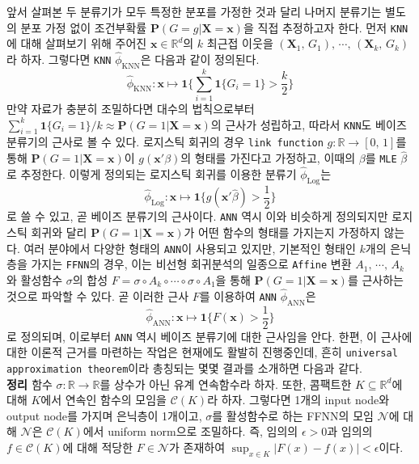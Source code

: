 \documentclass[11pt,onecolumn,twoside,a4size]{gsag3jnl}
\begin{document}
앞서 살펴본 두 분류기가 모두 특정한 분포를 가정한 것과 달리 나머지 분류기는 별도의 분포 가정 없이 조건부확률 $\mathbf{P}(G=g\vert\mathbf{X}=\mathbf{x})$을 직접 추정하고자 한다. 먼저 \texttt{KNN}에 대해 살펴보기 위해 주어진 $\mathbf{x}\in\mathbb{R}^d$의 $k$ 최근접 이웃을 $(\mathbf{X}_1,\,G_1),\,\cdots,\,(\mathbf{X}_k,\,G_k)$라 하자. 그렇다면 \texttt{KNN} $\widehat{\phi}_\mathrm{KNN}$은 다음과 같이 정의된다.
\begin{equation}\label{eq:KNN}
  \widehat{\phi}_\mathrm{KNN}:\mathbf{x}\mapsto\mathbf{1}\bigg\{\sum_{i=1}^k\mathbf{1}\{G_i=1\}>\frac{k}{2}\bigg\}
\end{equation}
만약 자료가 충분히 조밀하다면 대수의 법칙으로부터 $\sum_{i=1}^k\mathbf{1}\{G_i=1\}/k\approx\mathbf{P}(G=1\vert\mathbf{X}=\mathbf{x})$의 근사가 성립하고, 따라서 \texttt{KNN}도 베이즈 분류기의 근사로 볼 수 있다. 로지스틱 회귀의 경우 \texttt{link function} $g:\mathbb{R}\to[0,\,1]$를 통해 $\mathbf{P}(G=1\vert\mathbf{X}=\mathbf{x})$이 $g(\mathbf{x}'\beta)$의 형태를 가진다고 가정하고, 이때의 $\beta$를 \texttt{MLE} $\widehat{\beta}$로 추정한다. 이렇게 정의되는 로지스틱 회귀를 이용한 분류기 $\widehat{\phi}_\mathrm{Log}$는
\begin{equation}
  \widehat{\phi}_\mathrm{Log}:\mathbf{x}\mapsto\mathbf{1}\bigg\{g(\mathbf{x}'\widehat{\beta})>\frac{1}{2}\bigg\}
\end{equation}
로 쓸 수 있고, 곧 베이즈 분류기의 근사이다. \texttt{ANN} 역시 이와 비슷하게 정의되지만 로지스틱 회귀와 달리 $\mathbf{P}(G=1\vert\mathbf{X}=\mathbf{x})$가 어떤 함수의 형태를 가지는지 가정하지 않는다. 여러 분야에서 다양한 형태의 \texttt{ANN}이 사용되고 있지만, 기본적인 형태인 $k$개의 은닉층을 가지는 \texttt{FFNN}의 경우, 이는 비선형 회귀분석의 일종으로 \texttt{Affine} 변환 $A_1,\,\cdots,\,A_k$와 활성함수 $\sigma$의 합성 $F=\sigma\circ A_k\circ\cdots\circ\sigma\circ A_1$을 통해 $\mathbf{P}(G=1\vert\mathbf{X}=\mathbf{x})$를 근사하는 것으로 파악할 수 있다. 곧 이러한 근사 $F$를 이용하여 \texttt{ANN} $\widehat{\phi}_\mathrm{ANN}$은
\begin{equation}
  \widehat{\phi}_\mathrm{ANN}:\mathbf{x}\mapsto\mathbf{1}\bigg\{F(\mathbf{x})>\frac{1}{2}\bigg\}
\end{equation}
로 정의되며, 이로부터 \texttt{ANN} 역시 베이즈 분류기에 대한 근사임을 안다. 한편, 이 근사에 대한 이론적 근거를 마련하는 작업은 현재에도 활발히 진행중인데, 흔히 \texttt{universal approximation theorem}이라 총칭되는 몇몇 결과를 소개하면 다음과 같다.\\

\noindent\textsf{\textbf{정리 \citep{Cybenko1989}} 함수 $\sigma:\mathbb{R}\to\mathbb{R}$를 상수가 아닌 유계 연속함수라 하자. 또한, 콤팩트한 $K\subseteq\mathbb{R}^d$에 대해 $K$에서 연속인 함수의 모임을 $\mathcal{C}(K)$라 하자. 그렇다면 1개의 input node와 output node를 가지며 은닉층이 1개이고, $\sigma$를 활성함수로 하는 FFNN의 모임 $\mathcal{N}$에 대해 $\mathcal{N}$은 $\mathcal{C}(K)$에서 uniform norm으로 조밀하다. 즉, 임의의 $\epsilon>0$과 임의의 $f\in\mathcal{C}(K)$에 대해 적당한 $F\in\mathcal{N}$가 존재하여 $\sup_{x\in K}|F(x)-f(x)|<\epsilon$이다.}\\
\end{document}
